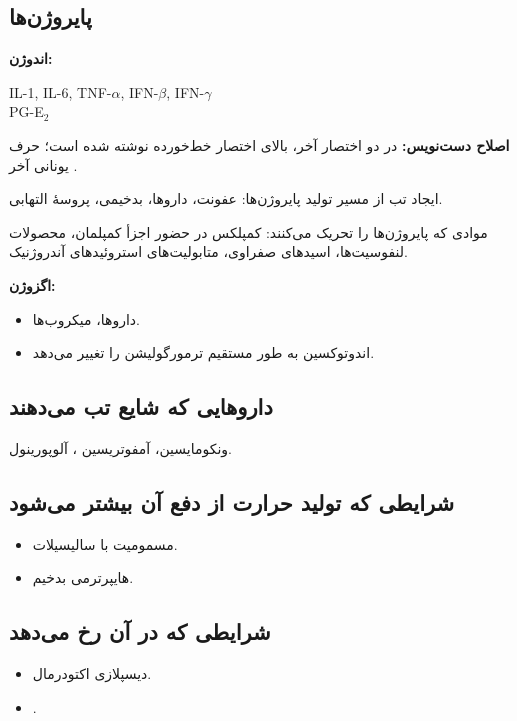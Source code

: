 \documentclass[12pt,a4paper]{article}
\begin{document}
\subsection*{پایروژن‌ها}
\textbf{اندوژن:}
\begin{latin}
IL-1, IL-6, TNF-\(\alpha\), IFN-\(\beta\), IFN-\(\gamma\)\\
PG-E\(_2\)
\end{latin}
\textbf{اصلاح دست‌نویس:} در دو اختصار آخر،  بالای اختصار خط‌خورده نوشته شده است؛ حرف یونانی آخر .

ایجاد تب از مسیر تولید پایروژن‌ها: عفونت، داروها، بدخیمی، پروسهٔ التهابی.

موادی که پایروژن‌ها را تحریک می‌کنند:
کمپلکس  در حضور اجزأ کمپلمان، محصولات لنفوسیت‌ها، اسیدهای صفراوی، متابولیت‌های استروئیدهای آندروژنیک.

\textbf{اگزوژن:}
\begin{itemize}
\item داروها، میکروب‌ها.
\item اندوتوکسین به طور مستقیم ترمورگولیشن را تغییر می‌دهد.
\end{itemize}

\subsection*{داروهایی که شایع تب می‌دهند}
ونکومایسین، آمفوتریسین ، آلوپورینول.

\subsection*{شرایطی که تولید حرارت از دفع آن بیشتر می‌شود}
\begin{itemize}
\item مسمومیت با سالیسیلات.
\item هایپرترمی بدخیم.
\end{itemize}

\subsection*{شرایطی که در آن  رخ می‌دهد}
\begin{itemize}
\item دیسپلازی اکتودرمال.
\item {}.
\end{itemize}
\end{document}
